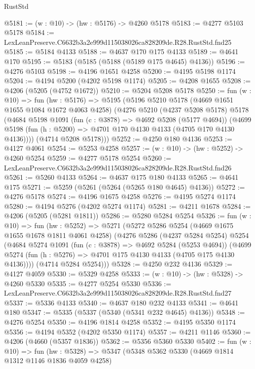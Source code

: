 \begin{lexlean}{RustStd}
\begin{coremodule}
@5181 := (w : @10) -> (hw : @5176) -> @4260 @5178
@5183 := @4277 @5103 @5178
@5184 := LexLeanPreserve.C6632b3a2e999d115038026ca828209de.R28.RustStd.fnd25
@5185 := @5184 @4133
@5188 := @4637 @170 @175 @4133
@5189 := @4641 @170
@5195 := @5183 (@5185 (@5188 (@5189 @175 @4645) @4136))
@5196 := @4276 @5103
@5198 := @4196 @1651 @4258
@5200 := @4195 @5198 @1174
@5204 := @4194 @5200 (@4202 @5198 @1174)
@5205 := @4208 @1655
@5208 := @4206 (@5205 (@4752 @1672))
@5210 := @5204 @5208 @5178
@5250 := fun (w : @10) =>
  fun (hw : @5176) =>
  @5195
    (@5196
      @5210
      @5178
      (@4669 @1651 @1655 @1084 @1672 @4063 @4258)
      (@4276
        @5210
        (@4237 @5208 @5178)
        @5178
        (@4684
          @5198
          @1091
          (fun (c : @3878) => @4692 @5208 (@5177 @4694))
          (@4699 @5198 (fun (h : @5200) => @4701 @170 @4130 @4133 (@4705 @170 @4130 @4136))))
        (@4714 @5208 @5178)))
@5252 := @4250 @180 @4136
@5253 := @4127 @4061
@5254 := @5253 @4258
@5257 := (w : @10) -> (hw : @5252) -> @4260 @5254
@5259 := @4277 @5178 @5254
@5260 := LexLeanPreserve.C6632b3a2e999d115038026ca828209de.R28.RustStd.fnd26
@5261 := @5260 @4133
@5264 := @4637 @175 @180 @4133
@5265 := @4641 @175
@5271 := @5259 (@5261 (@5264 (@5265 @180 @4645) @4136))
@5272 := @4276 @5178
@5274 := @4196 @1675 @4258
@5276 := @4195 @5274 @1174
@5280 := @4194 @5276 (@4202 @5274 @1174)
@5281 := @4211 @1678
@5284 := @4206 (@5205 (@5281 @1811))
@5286 := @5280 @5284 @5254
@5326 := fun (w : @10) =>
  fun (hw : @5252) =>
  @5271
    (@5272
      @5286
      @5254
      (@4669 @1675 @1655 @1678 @1811 @4061 @4258)
      (@4276
        @5286
        (@4237 @5284 @5254)
        @5254
        (@4684
          @5274
          @1091
          (fun (c : @3878) => @4692 @5284 (@5253 @4694))
          (@4699 @5274 (fun (h : @5276) => @4701 @175 @4130 @4133 (@4705 @175 @4130 @4136))))
        (@4714 @5284 @5254)))
@5328 := @4250 @232 @4136
@5329 := @4127 @4059
@5330 := @5329 @4258
@5333 := (w : @10) -> (hw : @5328) -> @4260 @5330
@5335 := @4277 @5254 @5330
@5336 := LexLeanPreserve.C6632b3a2e999d115038026ca828209de.R28.RustStd.fnd27
@5337 := @5336 @4133
@5340 := @4637 @180 @232 @4133
@5341 := @4641 @180
@5347 := @5335 (@5337 (@5340 (@5341 @232 @4645) @4136))
@5348 := @4276 @5254
@5350 := @4196 @1814 @4258
@5352 := @4195 @5350 @1174
@5356 := @4194 @5352 (@4202 @5350 @1174)
@5357 := @4211 @1146
@5360 := @4206 (@4660 (@5357 @1836))
@5362 := @5356 @5360 @5330
@5402 := fun (w : @10) =>
  fun (hw : @5328) =>
  @5347
    (@5348
      @5362
      @5330
      (@4669 @1814 @1312 @1146 @1836 @4059 @4258)

\end{coremodule}
\end{lexlean}
